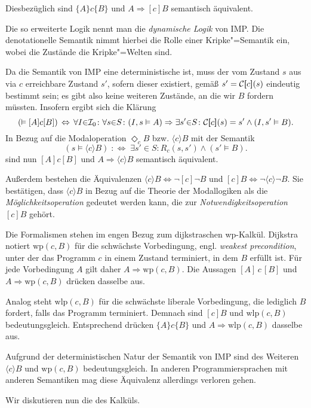 Diesbezüglich sind $\{A\}c\{B\}$ und $A\Rightarrow [c]B$ semantisch äquivalent.

Die so erweiterte Logik nennt man die \emph{dynamische Logik} von IMP.
Die denotationelle Semantik nimmt hierbei die Rolle einer Kripke"=Semantik
ein, wobei die Zustände die Kripke"=Welten sind.

Da die Semantik von IMP eine deterministische ist, muss der vom Zustand
$s$ aus via $c$ erreichbare Zustand $s'$, sofern dieser existiert,
gemäß $s'=\mathcal C[\hspace{-2.6pt}[c]\hspace{-2.4pt}](s)$ eindeutig bestimmt sein; es gibt also keine weiteren
Zustände, an die wir $B$ fordern müssten. Insofern ergibt sich die Klärung
\[(\vDash [A]c [B]) \,\Leftrightarrow\, \forall I{\in}\mathcal I_0\colon\forall s{\in}S\colon
(I,s\vDash A)\Rightarrow\exists s'{\in}S\colon \mathcal C[\hspace{-2.6pt}[c]\hspace{-2.4pt}](s)=s'\land (I,s'\vDash B).\]
In Bezug auf die Modaloperation $\Diamond_c B$ bzw. $\langle c\rangle B$ mit der Semantik
\[(s\models\langle c\rangle B)\;:\Leftrightarrow\; \exists s'\in S\colon R_c(s,s')\land (s'\models B).\]
sind nun $[A]c[B]$ und $A\Rightarrow\langle c\rangle B$ semantisch äquivalent.

Außerdem bestehen die Äquivalenzen
$\langle c\rangle B \Leftrightarrow \lnot [c]\lnot B$ und
$[c]B\Leftrightarrow\lnot\langle c\rangle\lnot B$. Sie bestätigen,
dass $\langle c\rangle B$ in Bezug auf die Theorie der Modallogiken
als die \emph{Möglichkeitsoperation} gedeutet werden kann, die zur
\emph{Notwendigkeitsoperation} $[c]B$ gehört.

Die Formalismen stehen im engen Bezug zum dijkstraschen wp-Kalkül.
Dijkstra notiert $\mathrm{wp}(c,B)$ für die schwächste Vorbedingung,
engl. \emph{weakest precondition}, unter der das Programm $c$ in einem
Zustand terminiert, in dem $B$ erfüllt ist. Für jede Vorbedingung $A$
gilt daher $A\Rightarrow\mathrm{wp}(c,B)$. Die Aussagen $[A]\,c\,[B]$
und $A\Rightarrow\mathrm{wp}(c,B)$ drücken dasselbe aus.

Analog steht $\mathrm{wlp}(c,B)$ für die schwächste liberale
Vorbedingung, die lediglich $B$ fordert, falls das Programm terminiert.
Demnach sind $[c]B$ und $\mathrm{wlp}(c,B)$ bedeutungsgleich.
Entsprechend drücken $\{A\}c\{B\}$ und $A\Rightarrow\mathrm{wlp}(c,B)$
dasselbe aus.

Aufgrund der deterministischen Natur der Semantik von IMP sind des Weiteren
$\langle c\rangle B$ und $\mathrm{wp}(c,B)$ bedeutungsgleich. In anderen
Programmiersprachen mit anderen Semantiken mag diese Äquivalenz allerdings
verloren gehen.

Wir diskutieren nun die  des Kalküls.

